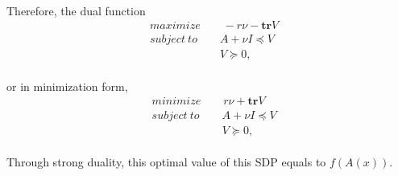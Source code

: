 \paragraph{}
Therefore, the dual function
\begin{align*}
&maximize \qquad  -r\nu-\textbf{tr}V \\
&subject\ to \qquad A+ \nu I \preceq V\\
&\qquad \qquad \qquad  \ V \succeq 0,
\end{align*}
\paragraph{}
or in minimization form,
\begin{align*}
&minimize \qquad  r\nu+\textbf{tr}V \\
&subject\ to \qquad A+ \nu I \preceq V\\
&\qquad \qquad \qquad  \ V \succeq 0,
\end{align*}
\paragraph{}
Through strong duality, this optimal value of this SDP equals to $f(A(x))$.